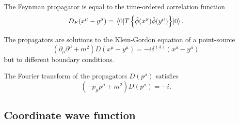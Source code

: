 \begin{corollary}
	The Feynman propagator is equal to the time-ordered correlation function
	\begin{equation}
		D_F(x^\mu-y^\mu)
		=
		\expval{T\left\{\hat\phi(x^\mu)\hat\phi(y^\mu)\right\}}{0}
		.
	\end{equation}
\end{corollary}
\begin{lemma}\label{thm:propagator_kg_solution}
	The propagators are solutions to the Klein-Gordon equation of a point-source
	\begin{equation}
		\left(
			\partial_\mu
			\partial^\mu
			+
			m^2
		\right)
		D(x^\mu-y^\mu)
		=
		-i\delta^{(4)}(x^\mu-y^\mu)
	\end{equation}
	but to different boundary conditions.
\end{lemma}
\begin{corollary}
	The Fourier transform of the propagators $D(p^\mu)$ satisfies
	\begin{equation}
		\left(
			-
			p_\mu p^\mu
			+
			m^2
		\right)
		D(p^\mu)
		=
		-i
		.
	\end{equation}
\end{corollary}

\subsection{Coordinate wave function}
